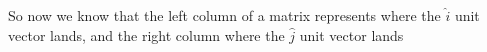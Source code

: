 \documentclass[preview]{standalone}
\begin{document}
\begin{minipage}
{8cm}So now we know that the left column of a matrix represents where the $\hat{i}$ unit vector lands, and the right column where the $\hat{j}$ unit vector lands
\end{minipage}
\end{document}
